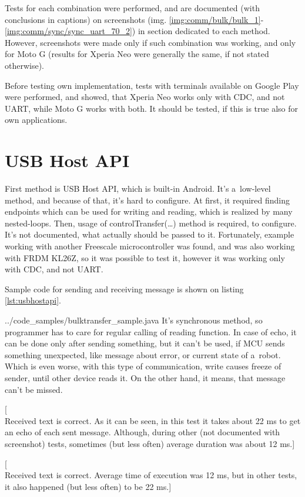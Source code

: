 Tests for each combination were performed, and are documented (with conclusions
in captions) on screenshots (img.
\ref{img:comm/bulk/bulk_1}-\ref{img:comm/sync/sync_uart_70_2}) in section
dedicated to each method.
However, screenshots were made only if such combination was working, and only
for Moto G (results for Xperia Neo were generally the same, if not stated
otherwise).

Before testing own implementation, tests with terminals available on Google Play
were performed, and showed, that Xperia Neo works only with CDC, and not UART,
while Moto G works with both.
It should be tested, if this is true also for own applications.

\section{USB Host API}
First method is USB Host API, which is built-in Android. 
It's a~low-level method, and because of that, it's hard to configure.
At first, it required finding endpoints which can be used for writing and
reading, which is realized by many nested-loops.
Then, usage of controlTransfer(\ldots) method is required, to configure.
It's not documented, what actually should be passed to it.
Fortunately, example working with another Freescale microcontroller was found,
and was also working with FRDM KL26Z, so it was possible to test it, however it
was working only with CDC, and not UART.

Sample code for sending and receiving message is shown on listing
\ref{lst:usbhostapi}.

{../code_samples/bulktransfer_sample.java}
It's synchronous method, so programmer has to care for regular calling of
reading function.
In case of echo, it can be done only after sending something, but it can't be
used, if MCU sends something unexpected, like message about error, or current
state of a~robot.
Which is even worse, with this type of communication, write causes freeze of
sender, until other device reads it.
On the other hand, it means, that message can't be missed.

[\\Received text is correct. 
As it can be seen, in this test it takes about 22 ms to get an echo of each sent
message.
Although, during other (not documented with screenshot) tests, sometimes (but
less often) average duration was about 12 ms.]

[\\Received text is correct. 
Average time of execution was 12 ms, but in other tests, it also happened (but
less often) to be 22 ms.]

